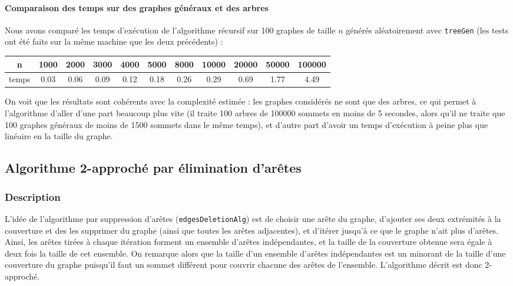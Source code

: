 \documentclass[a4paper,10pt]{article}
\begin{document}
\paragraph{Comparaison des temps sur des graphes généraux et des arbres}

Nous avons comparé les temps d'exécution de l'algorithme récursif sur 100 graphes de taille $n$ générés aléatoirement avec \texttt{treeGen} (les tests ont été faits sur la même machine que les deux précédents) :
\begin{center}
\begin{tabular}{|c|c|c|c|c|c|c|c|c|c|c|}
	\hline 
	n & 1000 & 2000 & 3000 & 4000 & 5000 & 8000 & 10000 & 20000 & 50000 & 100000 \\
	\hline
	temps & 0.03 & 0.06 & 0.09 & 0.12 & 0.18 & 0.26 & 0.29 & 0.69 & 1.77 & 4.49\\
	\hline
\end{tabular}
\end{center}

On voit que les résultats sont cohérents avec la complexité estimée : les graphes considérés ne sont que des arbres, ce qui permet à l'algorithme d'aller d'une part beaucoup plus vite (il traite 100 arbres de 100000 sommets en moins de 5 secondes, alors qu'il ne traite que 100 graphes généraux de moins de 1500 sommets dans le même temps), et d'autre part d'avoir un temps d'exécution à peine plus que linéaire en la taille du graphe.


\subsection{Algorithme 2-approché par élimination d'arêtes}

\subsubsection{Description}

L'idée de l'algorithme par suppression d'arêtes (\texttt{edgesDeletionAlg}) est de choisir une arête du graphe, d'ajouter ses deux extrémités à la couverture et des les supprimer du graphe (ainsi que toutes les arêtes adjacentes), et d'itérer jusqu'à ce que le graphe n'ait plus d'arêtes. Ainsi, les arêtes tirées à chaque itération forment un ensemble d'arêtes indépendantes, et la taille de la couverture obtenue sera égale à deux fois la taille de cet ensemble. On remarque alors que la taille d'un ensemble d'arêtes indépendantes est un minorant de la taille d'une couverture du graphe puisqu'il faut un sommet différent pour couvrir chacune des arêtes de l'ensemble. L'algorithme décrit est donc 2-approché.
\end{document}
